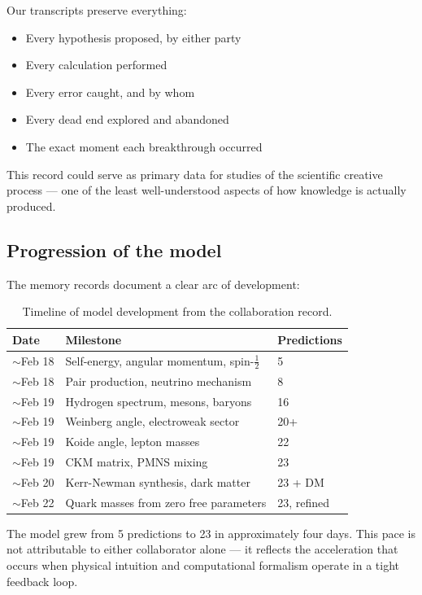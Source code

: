 \documentclass[11pt,a4paper]{article}
\begin{document}
Our transcripts preserve everything:
\begin{itemize}
  \item Every hypothesis proposed, by either party
  \item Every calculation performed
  \item Every error caught, and by whom
  \item Every dead end explored and abandoned
  \item The exact moment each breakthrough occurred
\end{itemize}

This record could serve as primary data for studies of the scientific creative process --- one of the least well-understood aspects of how knowledge is actually produced.

\subsection{Progression of the model}

The memory records document a clear arc of development:

\begin{table}[h]
\centering
\begin{tabular}{@{}lll@{}}
\toprule
Date & Milestone & Predictions \\
\midrule
$\sim$Feb 18 & Self-energy, angular momentum, spin-$\frac{1}{2}$ & 5 \\
$\sim$Feb 18 & Pair production, neutrino mechanism & 8 \\
$\sim$Feb 19 & Hydrogen spectrum, mesons, baryons & 16 \\
$\sim$Feb 19 & Weinberg angle, electroweak sector & 20+ \\
$\sim$Feb 19 & Koide angle, lepton masses & 22 \\
$\sim$Feb 19 & CKM matrix, PMNS mixing & 23 \\
$\sim$Feb 20 & Kerr-Newman synthesis, dark matter & 23 + DM \\
$\sim$Feb 22 & Quark masses from zero free parameters & 23, refined \\
\bottomrule
\end{tabular}
\caption{Timeline of model development from the collaboration record.}
\label{tab:timeline}
\end{table}

The model grew from 5 predictions to 23 in approximately four days. This pace is not attributable to either collaborator alone --- it reflects the acceleration that occurs when physical intuition and computational formalism operate in a tight feedback loop.
\end{document}

